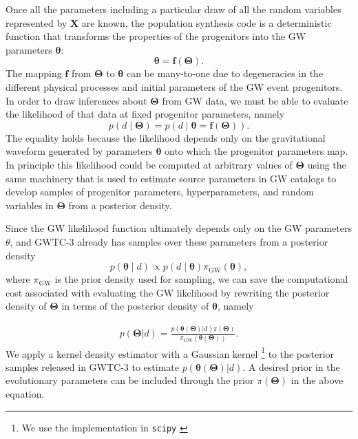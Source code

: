 \documentclass[linenumbers,twocolumn]{aastex631}
\begin{document}
Once all the parameters including a particular draw of all the random variables
represented by $\bm{X}$ are known, the population synthesis code is a
deterministic function that transforms the properties of the progenitors into
the GW parameters $\bm{\theta}$:
\begin{equation}
    \bm{\theta} = \bm{f}\left( \bm{\Theta} \right).
\end{equation}
The mapping $\bm{f}$ from $\bm{\Theta}$ to $\bm{\theta}$ can be many-to-one due
to degeneracies in the different physical processes and initial parameters of
the GW event progenitors. In order to draw inferences about $\bm{\Theta}$ from
GW data, we must be able to evaluate the likelihood of that data at fixed
progenitor parameters, namely
\begin{equation}
    p\left( d \mid \bm{\Theta} \right) = p\left( d \mid \bm{\theta} = \bm{f}\left( \bm{\Theta} \right) \right).
\end{equation}
The equality holds because the likelihood depends only on the gravitational
waveform generated by parameters $\bm{\theta}$ onto which the progenitor
parameters map.  In principle this likelihood could be computed at arbitrary
values of $\bm{\Theta}$ using the same machinery that is used to estimate source
parameters in GW catalogs \citep{Veitch2015,Ashton2019,Romero-Shaw2020,GWTC-3}
to develop samples of progenitor parameters, hyperparameters, and random
variables in $\bm{\Theta}$ from a posterior density.

Since the GW likelihood function ultimately depends only on the GW parameters
$\theta$, and GWTC-3 already has samples over these parameters from a posterior
density
\begin{equation}
    p\left( \bm{\theta} \mid d \right) \propto p\left( d \mid \bm{\theta} \right) \pi_\mathrm{GW} \left( \bm{\theta} \right),
\end{equation}
where $\pi_\mathrm{GW}$ is the prior density used for sampling, we can save the
computational cost associated with evaluating the GW likelihood by rewriting the
posterior density of $\bm{\Theta}$ in terms of the posterior density of
$\bm{\theta}$, namely

\begin{align}
    p(\bm{\Theta} | d) = \frac{p(\bm{\theta}(\bm{\Theta})| d) \pi(\bm{\Theta})}{\pi_\mathrm{GW}(\bm{\theta}(\bm{\Theta}))}.
\end{align}
We apply a kernel density estimator with a Gaussian kernel \footnote{We use the
implementation in \texttt{scipy} \cite{2020SciPy-NMeth}} to the posterior
samples released in GWTC-3 to estimate $p(\bm{\theta}(\bm{\Theta})|d)$.
A desired prior in the evolutionary parameters can be included through
the prior $\pi(\bm{\Theta})$ in the above equation.
\end{document}
